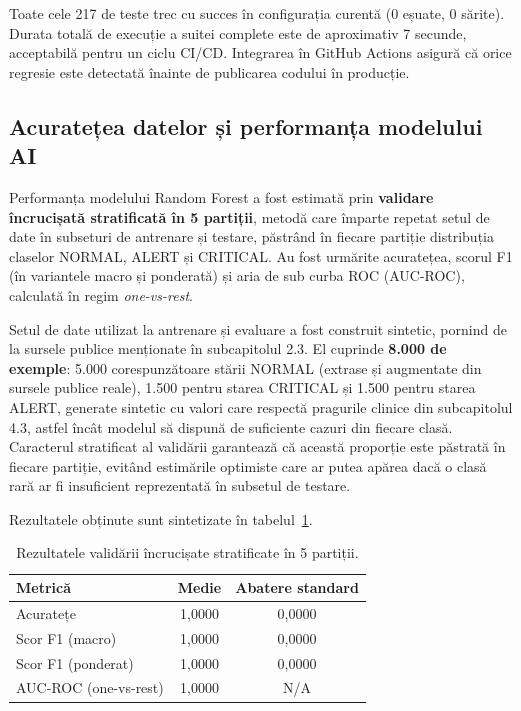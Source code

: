 Toate cele 217 de teste trec cu succes în configurația curentă (0 eșuate, 0 sărite). Durata totală de execuție a suitei complete este de aproximativ 7 secunde, acceptabilă pentru un ciclu CI/CD. Integrarea în GitHub Actions asigură că orice regresie este detectată înainte de publicarea codului în producție.

\subsection{Acuratețea datelor și performanța modelului AI}

Performanța modelului Random Forest a fost estimată prin \textbf{validare încrucișată stratificată în 5 partiții}, metodă care împarte repetat setul de date în subseturi de antrenare și testare, păstrând în fiecare partiție distribuția claselor NORMAL, ALERT și CRITICAL. Au fost urmărite acuratețea, scorul F1 (în variantele macro și ponderată) și aria de sub curba ROC (AUC-ROC), calculată în regim \textit{one-vs-rest}.

Setul de date utilizat la antrenare și evaluare a fost construit sintetic, pornind de la sursele publice menționate în subcapitolul 2.3. El cuprinde \textbf{8.000 de exemple}: 5.000 corespunzătoare stării NORMAL (extrase și augmentate din sursele publice reale), 1.500 pentru starea CRITICAL și 1.500 pentru starea ALERT, generate sintetic cu valori care respectă pragurile clinice din subcapitolul 4.3, astfel încât modelul să dispună de suficiente cazuri din fiecare clasă. Caracterul stratificat al validării garantează că această proporție este păstrată în fiecare partiție, evitând estimările optimiste care ar putea apărea dacă o clasă rară ar fi insuficient reprezentată în subsetul de testare.

Rezultatele obținute sunt sintetizate în tabelul~\ref{tab:cv-results}.

\begin{table}[H]
\centering
\small
\renewcommand{\arraystretch}{1.3}
\begin{tabular}{|>{\raggedright\arraybackslash}p{5.5cm}|c|c|}
\hline
\textbf{Metrică} & \textbf{Medie} & \textbf{Abatere standard}\\
\hline
Acuratețe & 1,0000 & 0,0000\\
\hline
Scor F1 (macro) & 1,0000 & 0,0000\\
\hline
Scor F1 (ponderat) & 1,0000 & 0,0000\\
\hline
AUC-ROC (one-vs-rest) & 1,0000 & N/A\\
\hline
\end{tabular}
\caption{Rezultatele validării încrucișate stratificate în 5 partiții.}
\label{tab:cv-results}
\end{table}

